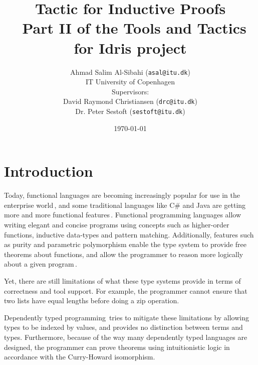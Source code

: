 \documentclass[a4paper]{article}%
\begin{document}
\title{Tactic for Inductive Proofs \\ \normalsize{Part II of the Tools and Tactics for Idris project}}
\author{Ahmad Salim Al-Sibahi (\texttt{asal@itu.dk}) \\IT University of Copenhagen\\Supervisors: \\David Raymond Christiansen (\texttt{drc@itu.dk})\\ Dr. Peter Sestoft (\texttt{sestoft@itu.dk})}
\date{\today}


\maketitle
\lstset{basicstyle=\scriptsize\unicodemonofamily, captionpos=b, extendedchars=false, numbers=left, stepnumber=3, firstnumber=1, language=Haskell}



\section{Introduction}
\label{sec:Introduction}
Today, functional languages are becoming increasingly popular for use in the enterprise world\,\cite{ford2013functionalthinking}, and some traditional languages like C\# and Java are getting more and more functional features\,\cite{oracle2013projectlambda}\cite{microsoft2013linq}.
Functional programming languages allow writing elegant and concise programs using concepts such as higher-order functions, inductive data-types and pattern matching.
Additionally, features such as purity and parametric polymorphism enable the type system to provide free theorems about functions,
and allow the programmer to reason more logically about a given program\,\cite{wadler1989theorems}.

Yet, there are still limitations of what these type systems provide in terms of correctness and tool support. For example, the programmer cannot ensure that two lists have equal lengths before doing a zip operation.

Dependently typed programming\,\cite{univalent2013hott} tries to mitigate these limitations by allowing types to be indexed by values, and provides no distinction between terms and types.
Furthermore, because of the way many dependently typed languages are designed, the programmer can prove theorems using intuitionistic logic in accordance with the Curry-Howard isomorphism\cite{mckinna2013deptypes}.
\end{document}
